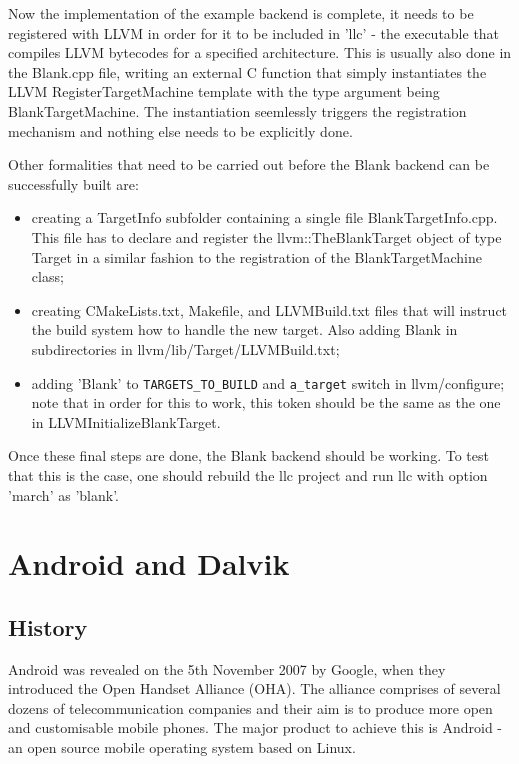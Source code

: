 \documentclass[parskip]{cs4rep}
\begin{document}
Now the implementation of the example backend is complete, it needs to be registered with LLVM in order for it to be included in 'llc' - the executable that compiles LLVM bytecodes for a specified architecture. This is usually also done in the Blank.cpp file, writing an external C function that simply instantiates the LLVM RegisterTargetMachine template with the type argument being BlankTargetMachine. The instantiation seemlessly triggers the registration mechanism and nothing else needs to be explicitly done.

Other formalities that need to be carried out before the Blank backend can be successfully built are:
\begin{itemize}
\item
creating a TargetInfo subfolder containing a single file BlankTargetInfo.cpp. This file has to declare and register the llvm::TheBlankTarget object of type Target in a similar fashion to the registration of the BlankTargetMachine class;
\item
creating CMakeLists.txt, Makefile, and LLVMBuild.txt files that will instruct the build system how to handle the new target. Also adding Blank in subdirectories in llvm/lib/Target/LLVMBuild.txt;
\item
adding 'Blank' to \verb|TARGETS_TO_BUILD| and \verb|a_target| switch in llvm/configure; note that in order for this to work, this token should be the same as the one in LLVMInitializeBlankTarget.
\end{itemize}

Once these final steps are done, the Blank backend should be working. To test that this is the case, one should rebuild the llc project and run llc with option 'march' as 'blank'.

\section{Android and Dalvik}

\subsection{History}

Android was revealed on the 5th November 2007 by Google, when they introduced the Open Handset Alliance (OHA)\cite{DeLacey2007}. The alliance comprises of several dozens of telecommunication companies and their aim is to produce more open and customisable mobile phones. The major product to achieve this is Android - an open source mobile operating system based on Linux.
\end{document}
